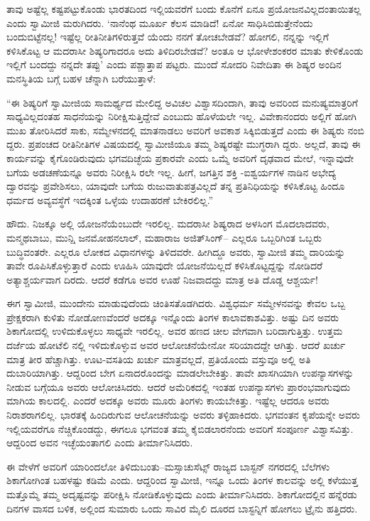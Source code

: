 ತಾವು ಅಷ್ಟೆಲ್ಲ ಕಷ್ಟಪಟ್ಟುಕೊಂಡು ಭಾರತದಿಂದ ಇಲ್ಲಿಯವರೆಗೆ ಬಂದು ಕೊನೆಗೆ ಏನೂ ಪ್ರಯೋಜನವಿಲ್ಲದಂತಾಯಿತಲ್ಲ ಎಂದು ಸ್ವಾಮೀಜಿ ಮರುಗಿದರು. ‘ನಾನೆಂಥ ಮೂರ್ಖ ಕೆಲಸ ಮಾಡಿದೆ! ಏನೋ ಸಾಧಿಸಿಬಿಡುತ್ತೇನೆಂದು ಬಂದುಬಿಟ್ಟೆನಲ್ಲ! ಇಷ್ಟೆಲ್ಲ ರೀತಿನೀತಿಗಳಿರುತ್ತವೆ ಯೆಂದು ನನಗೆ ತೋಚಬೇಡವೆ? ಹೋಗಲಿ, ನನ್ನನ್ನು ಇಲ್ಲಿಗೆ ಕಳಿಸಿಕೊಟ್ಟ ಆ ಮದರಾಸೀ ಶಿಷ್ಯರಿಗಾದರೂ ಅದು ತಿಳಿದಿರಬೇಡವೆ? ಅಂತೂ ಆ ಭೋಳೇಶಂಕರರ ಮಾತು ಕೇಳಿಕೊಂಡು ಇಲ್ಲಿಗೆ ಬಂದದ್ದು ನನ್ನದೇ ತಪ್ಪು’ ಎಂದು ಪಶ್ಚಾತ್ತಾಪ ಪಟ್ಟರು. ಮುಂದೆ ಸೋದರಿ ನಿವೇದಿತಾ ಈ ಶಿಷ್ಯರ ಅಂದಿನ ಮನಸ್ಥಿತಿಯ ಬಗ್ಗೆ ಬಹಳ ಚೆನ್ನಾಗಿ ಬರೆಯುತ್ತಾಳೆ:

“ಈ ಶಿಷ್ಯರಿಗೆ ಸ್ವಾಮೀಜಿಯ ಸಾಮರ್ಥ್ಯದ ಮೇಲಿದ್ದ ಅವಿಚಲ ವಿಶ್ವಾಸದಿಂದಾಗಿ, ತಾವು ಅವರಿಂದ ಮನುಷ್ಯಮಾತ್ರರಿಗೆ ಸಾಧ್ಯವಿಲ್ಲದಂತಹ ಸಾಧನೆಯನ್ನು ನಿರೀಕ್ಷಿಸುತ್ತಿದ್ದೇವೆ ಎಂಬುದು ಹೊಳೆಯಲೇ ಇಲ್ಲ. ವಿವೇಕಾನಂದರು ಅಲ್ಲಿಗೆ ಹೋಗಿ ಮುಖ ತೋರಿಸಿದರೆ ಸಾಕು, ಸಮ್ಮೇಳನದಲ್ಲಿ ಮಾತನಾಡಲು ಅವರಿಗೆ ಅವಕಾಶ ಸಿಕ್ಕಿಬಿಡುತ್ತದೆ ಎಂದು ಈ ಶಿಷ್ಯರು ನಂಬಿ ದ್ದರು. ಪ್ರಪಂಚದ ರೀತಿನೀತಿಗಳ ವಿಷಯದಲ್ಲಿ ಸ್ವಾಮೀಜಿಯೂ ತಮ್ಮ ಶಿಷ್ಯರಷ್ಟೇ ಮುಗ್ಧರಾಗಿ ದ್ದರು. ಅಲ್ಲದೆ, ತಾವು ಈ ಕಾರ್ಯವನ್ನು ಕೈಗೊಂಡಿರುವುದು ಭಗವದಿಚ್ಛೆಯ ಪ್ರಕಾರವೇ ಎಂದು ಒಮ್ಮೆ ಅವರಿಗೆ ದೃಢವಾದ ಮೇಲೆ, ಇನ್ನಾವುದೇ ಬಗೆಯ ಅಡಚಣೆಯನ್ನೂ ಅವರು ನಿರೀಕ್ಷಿಸಿ ರಲೇ ಇಲ್ಲ. ಹೀಗೆ, ಜಗತ್ತಿನ ಶಕ್ತಿ -ಐಶ್ವರ್ಯಗಳ ನಾಡಿನ ಅಭೇದ್ಯ ದ್ವಾರವನ್ನು ಪ್ರವೇಶಿಸಲು, ಯಾವುದೇ ಬಗೆಯ ರುಜುವಾತುಪತ್ರವಿಲ್ಲದೆ ತನ್ನ ಪ್ರತಿನಿಧಿಯನ್ನು ಕಳಿಸಿಕೊಟ್ಟ ಹಿಂದೂ ಧರ್ಮದ ಅವ್ಯವಸ್ಥೆಗೆ ಇದಕ್ಕಿಂತ ಒಳ್ಳೆಯ ಉದಾಹರಣೆ ಬೇಕಿರಲಿಲ್ಲ.”

ಹೌದು. ನಿಜಕ್ಕೂ ಅಲ್ಲಿ ಯೋಜನೆಯೆಂಬುದೇ ಇರಲಿಲ್ಲ. ಮದರಾಸೀ ಶಿಷ್ಯರಾದ ಅಳಸಿಂಗ ಮೊದಲಾದವರು, ಮನ್ಮಥಬಾಬು, ಮುನ್ಷಿ ಜನಮೋಹನಲಾಲ್, ಮಹಾರಾಜ ಅಜಿತ್​ಸಿಂಗ್​– ಎಲ್ಲರೂ ಒಬ್ಬರಿಗಿಂತ ಒಬ್ಬರು ಬುದ್ಧಿವಂತರೇ. ಎಲ್ಲರೂ ಲೋಕದ ವಿಧಾನಗಳನ್ನು ತಿಳಿದವರೇ. ಹೀಗಿದ್ದೂ ಅವರು, ಸ್ವಾಮೀಜಿ ತಮ್ಮ ದಾರಿಯನ್ನು ತಾವೇ ರೂಪಿಸಿಕೊಳ್ಳುತ್ತಾರೆ ಎಂದು ಊಹಿಸಿ ಯಾವುದೇ ಯೋಜನೆಯಿಲ್ಲದೆ ಕಳಿಸಿಕೊಟ್ಟದ್ದನ್ನು ನೋಡಿದರೆ ಅತ್ಯಾಶ್ಚರ್ಯವಾಗ ದಿರದು. ಆದರೆ ಕಡೆಗೂ ಅವರ ಊಹೆ ನಿಜವಾದದ್ದು ಮಾತ್ರ ಅತಿ ದೊಡ್ಡ ಆಶ್ಚರ್ಯ!

ಈಗ ಸ್ವಾಮೀಜಿ, ಮುಂದೇನು ಮಾಡುವುದೆಂದು ಚಿಂತಿಸತೊಡಗಿದರು. ವಿಶ್ವಧರ್ಮ ಸಮ್ಮೇಳನವನ್ನು ಕೇವಲ ಒಬ್ಬ ಪ್ರೇಕ್ಷಕರಾಗಿ ಕುಳಿತು ನೋಡೋಣವೆಂದರೆ ಅದಕ್ಕೂ ಇನ್ನೊಂದು ತಿಂಗಳ ಕಾಲಾವಕಾಶವಿತ್ತು. ಅಷ್ಟು ದಿನ ಅವರು ಶಿಕಾಗೋದಲ್ಲಿ ಉಳಿದುಕೊಳ್ಳಲು ಸಾಧ್ಯವೇ ಇರಲಿಲ್ಲ. ಅವರ ಹಣದ ಚೀಲ ವೇಗವಾಗಿ ಬರಿದಾಗುತ್ತಿತ್ತು. ಉತ್ತಮ ದರ್ಜೆಯ ಹೋಟೆಲಿ ನಲ್ಲಿ ಇಳಿದುಕೊಳ್ಳುವ ಅವರ ಆಲೋಚನೆಯೇನೋ ಸರಿಯಾದದ್ದೇ ಆಗಿತ್ತು. ಆದರೆ ಖರ್ಚು ಮಾತ್ರ ತೀರ ಹೆಚ್ಚಾಗಿತ್ತು. ಊಟ-ವಸತಿಯ ಖರ್ಚು ಮಾತ್ರವಲ್ಲದೆ, ಪ್ರತಿಯೊಂದು ವಸ್ತುವೂ ಅಲ್ಲಿ ಅತಿ ದುಬಾರಿಯಾಗಿತ್ತು. ಆದ್ದರಿಂದ ಬೇಗ ಏನಾದರೊಂದನ್ನು ಮಾಡಲೇಬೇಕಿತ್ತು. ತಾವೇ ಖಾಸಗಿಯಾಗಿ ಉಪನ್ಯಾಸಗಳನ್ನು ನೀಡುವ ಬಗ್ಗೆಯೂ ಅವರು ಆಲೋಚಿಸಿದರು. ಆದರೆ ಅಮೆರಿಕದಲ್ಲಿ ಇಂತಹ ಉಪನ್ಯಾಸಗಳು ಪ್ರಾರಂಭವಾಗುವುದು ಮಾಗಿಯ ಕಾಲದಲ್ಲಿ. ಎಂದರೆ ಅದಕ್ಕೂ ಅವರು ಮೂರು ತಿಂಗಳು ಕಾಯಬೇಕಿತ್ತು. ಇಷ್ಟೆಲ್ಲ ಆದರೂ ಅವರು ನಿರಾಶರಾಗಲಿಲ್ಲ. ಭಾರತಕ್ಕೆ ಹಿಂದಿರುಗುವ ಆಲೋಚನೆಯನ್ನು ಅವರು ತಳ್ಳಿಹಾಕಿದರು. ಭಗವಂತನ ಕೃಪೆಯನ್ನೇ ಅವರು ಇಲ್ಲಿಯವರೆಗೂ ನೆಚ್ಚಿಕೊಂಡದ್ದು, ಈಗಲೂ ಭಗವಂತ ತಮ್ಮ ಕೈಬಿಡಲಾರನೆಂದು ಅವರಿಗೆ ಸಂಪೂರ್ಣ ವಿಶ್ವಾಸವಿತ್ತು. ಆದ್ದರಿಂದ ಅವನ ಇಚ್ಛೆಯಂತಾಗಲಿ ಎಂದು ತೀರ್ಮಾನಿಸಿದರು.

ಈ ವೇಳೆಗೆ ಅವರಿಗೆ ಯಾರಿಂದಲೋ ತಿಳಿದುಬಂತು–ಮಸ್ಸಾಚುಸೆಟ್ಸ್ ರಾಜ್ಯದ ಬಾಸ್ಟನ್ ನಗರದಲ್ಲಿ ಬೆಲೆಗಳು ಶಿಕಾಗೋಗಿಂತ ಬಹಳಷ್ಟು ಕಡಿಮೆ ಎಂದು. ಆದ್ದರಿಂದ ಸ್ವಾಮೀಜಿ, ಇನ್ನೂ ಒಂದು ತಿಂಗಳ ಕಾಲವನ್ನು ಅಲ್ಲಿ ಕಳೆಯುತ್ತ ಮತ್ತೊಮ್ಮೆ ತಮ್ಮ ಅದೃಷ್ಟವನ್ನು ಪರೀಕ್ಷಿಸಿ ನೋಡಿಕೊಳ್ಳುವುದು ಎಂದು ತೀರ್ಮಾನಿಸಿದರು. ಶಿಕಾಗೋದಲ್ಲಿನ ಹನ್ನೆರಡು ದಿನಗಳ ವಾಸದ ಬಳಿಕ, ಅಲ್ಲಿಂದ ಸುಮಾರು ಒಂದು ಸಾವಿರ ಮೈಲಿ ದೂರದ ಬಾಸ್ಟನ್ನಿಗೆ ಹೋಗಲು ಟ್ರೈನು ಹತ್ತಿದರು.


